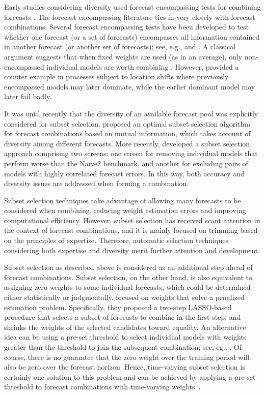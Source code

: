 \documentclass[a4paper,11pt]{article}
\begin{document}
Early studies considering diversity used forecast encompassing tests for combining forecasts \citep[e.g.,][]{Kicsinbay2010-et,Costantini2010-hp}. The forecast encompassing literature ties in very closely with forecast combinations. Several forecast encompassing tests have been developed to test whether one forecast (or a set of forecasts) encompasses all information contained in another forecast (or another set of forecasts); see, e.g., \citet{Chong1986-ec} and \citet{Harvey1998-fe}. A classical argument suggests that when fixed weights are used (as in an average), only non-encompassed individual models are worth combining \citep{Diebold1989-fe}. However, \citet{Hendry2004-pf} provided a counter example in processes subject to location shifts where previously encompassed models may later dominate, while the earlier dominant model may later fail badly.

It was until recently that the diversity of an available forecast pool was explicitly considered for subset selection. \citet{Cang2014-tp} proposed an optimal subset selection algorithm for forecast combinations based on mutual information, which takes account of diversity among different forecasts. More recently, \citet{Lichtendahl2020-ut} developed a subset selection approach comprising two screens: one screen for removing individual models that perform worse than the Na\"{i}ve2 benchmark, and another for excluding pairs of models with highly correlated forecast errors. In this way, both accuracy and diversity issues are addressed when forming a combination.

Subset selection techniques take advantage of allowing many forecasts to be considered when combining, reducing weight estimation errors and improving computational efficiency. However, subset selection has received scant attention in the context of forecast combinations, and it is mainly focused on trimming based on the principles of expertise. Therefore, automatic selection techniques considering both expertise and diversity merit further attention and development.

Subset selection as described above is considered as an additional step ahead of forecast combinations. Subset selection, on the other hand, is also equivalent to assigning zero weights to some individual forecasts, which could be determined either statistically or judgmentally. \citet{Diebold2019-ml} focused on weights that solve a penalized estimation problem. Specifically, they proposed a two-step LASSO-based procedure that selects a subset of forecasts to combine in the first step, and shrinks the weights of the selected candidates toward equality. An alternative idea can be using a pre-set threshold to select individual models with weights greater than the threshold to join the subsequent combination; see, eg., \citet{Zhou2002-cg,Wang2021-un}. Of course, there is no guarantee that the zero weight over the training period will also be zero over the forecast horizon. Hence, time-varying subset selection is certainly one solution to this problem and can be achieved by applying a pre-set threshold to forecast combinations with time-varying weights~\citep{Li2021-gk}.
\end{document}
